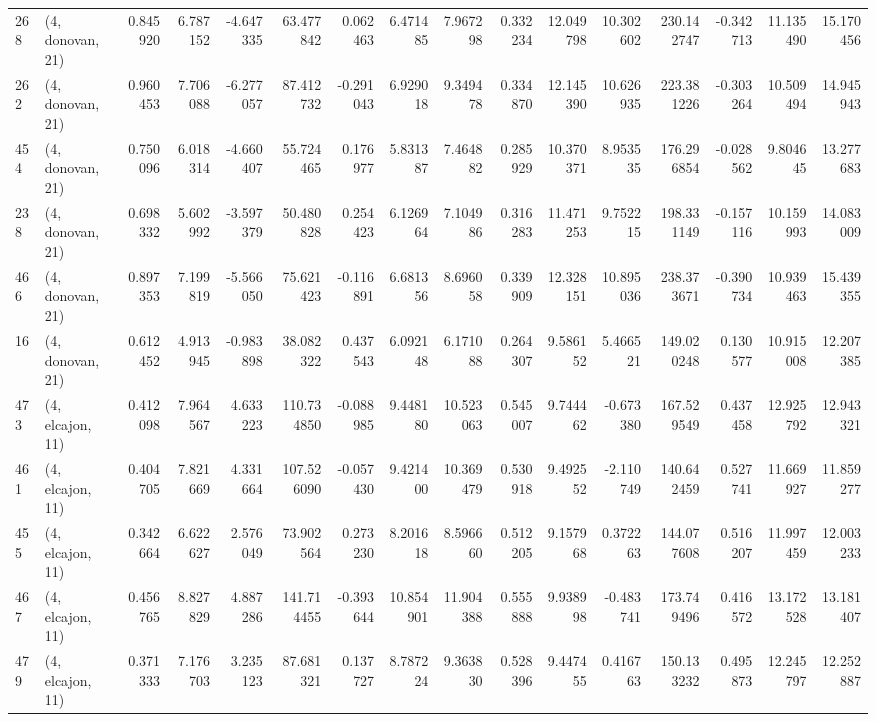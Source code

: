 \begin{tabular}{llrrrrrrrrrrrrrr}
268 &  (4, donovan, 21) &   0.845920 &   6.787152 &  -4.647335 &    63.477842 &   0.062463 &   6.471485 &   7.967298 &  0.332234 &  12.049798 &  10.302602 &   230.142747 &  -0.342713 &  11.135490 &  15.170456 \\
262 &  (4, donovan, 21) &   0.960453 &   7.706088 &  -6.277057 &    87.412732 &  -0.291043 &   6.929018 &   9.349478 &  0.334870 &  12.145390 &  10.626935 &   223.381226 &  -0.303264 &  10.509494 &  14.945943 \\
454 &  (4, donovan, 21) &   0.750096 &   6.018314 &  -4.660407 &    55.724465 &   0.176977 &   5.831387 &   7.464882 &  0.285929 &  10.370371 &   8.953535 &   176.296854 &  -0.028562 &   9.804645 &  13.277683 \\
238 &  (4, donovan, 21) &   0.698332 &   5.602992 &  -3.597379 &    50.480828 &   0.254423 &   6.126964 &   7.104986 &  0.316283 &  11.471253 &   9.752215 &   198.331149 &  -0.157116 &  10.159993 &  14.083009 \\
466 &  (4, donovan, 21) &   0.897353 &   7.199819 &  -5.566050 &    75.621423 &  -0.116891 &   6.681356 &   8.696058 &  0.339909 &  12.328151 &  10.895036 &   238.373671 &  -0.390734 &  10.939463 &  15.439355 \\
16  &  (4, donovan, 21) &   0.612452 &   4.913945 &  -0.983898 &    38.082322 &   0.437543 &   6.092148 &   6.171088 &  0.264307 &   9.586152 &   5.466521 &   149.020248 &   0.130577 &  10.915008 &  12.207385 \\
473 &  (4, elcajon, 11) &   0.412098 &   7.964567 &   4.633223 &   110.734850 &  -0.088985 &   9.448180 &  10.523063 &  0.545007 &   9.744462 &  -0.673380 &   167.529549 &   0.437458 &  12.925792 &  12.943321 \\
461 &  (4, elcajon, 11) &   0.404705 &   7.821669 &   4.331664 &   107.526090 &  -0.057430 &   9.421400 &  10.369479 &  0.530918 &   9.492552 &  -2.110749 &   140.642459 &   0.527741 &  11.669927 &  11.859277 \\
455 &  (4, elcajon, 11) &   0.342664 &   6.622627 &   2.576049 &    73.902564 &   0.273230 &   8.201618 &   8.596660 &  0.512205 &   9.157968 &   0.372263 &   144.077608 &   0.516207 &  11.997459 &  12.003233 \\
467 &  (4, elcajon, 11) &   0.456765 &   8.827829 &   4.887286 &   141.714455 &  -0.393644 &  10.854901 &  11.904388 &  0.555888 &   9.938998 &  -0.483741 &   173.749496 &   0.416572 &  13.172528 &  13.181407 \\
479 &  (4, elcajon, 11) &   0.371333 &   7.176703 &   3.235123 &    87.681321 &   0.137727 &   8.787224 &   9.363830 &  0.528396 &   9.447455 &   0.416763 &   150.133232 &   0.495873 &  12.245797 &  12.252887 \\

\end{tabular}
